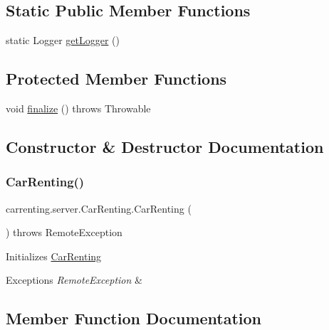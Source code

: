 \subsection*{Static Public Member Functions}
\begin{DoxyCompactItemize}
\item 
static Logger \mbox{\hyperlink{classcarrenting_1_1server_1_1_car_renting_ab6247bc987fa497393e8db651849f845}{get\+Logger}} ()
\end{DoxyCompactItemize}
\subsection*{Protected Member Functions}
\begin{DoxyCompactItemize}
\item 
void \mbox{\hyperlink{classcarrenting_1_1server_1_1_car_renting_ae7f5b4e17063c96ae0d81b230f79f549}{finalize}} ()  throws Throwable 
\end{DoxyCompactItemize}


\subsection{Constructor \& Destructor Documentation}
\mbox{\label{classcarrenting_1_1server_1_1_car_renting_aeb9f1491df8b5dd6b9a9c20a8a255fec}} 
\subsubsection{\texorpdfstring{CarRenting()}{CarRenting()}}
{\footnotesize\ttfamily carrenting.\+server.\+Car\+Renting.\+Car\+Renting (\begin{DoxyParamCaption}{ }\end{DoxyParamCaption}) throws Remote\+Exception}

Initializes \mbox{\hyperlink{classcarrenting_1_1server_1_1_car_renting}{Car\+Renting}} 
\begin{DoxyExceptions}{Exceptions}
{\em Remote\+Exception} & \\
\hline
\end{DoxyExceptions}


\subsection{Member Function Documentation}
\mbox{\label{classcarrenting_1_1server_1_1_car_renting_ab4f8e49f619868d8665ddb1fed45e398}} 
